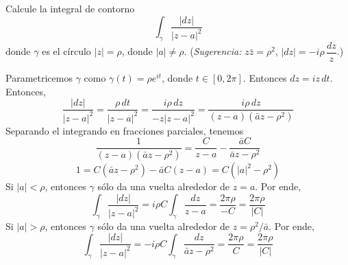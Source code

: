 \begin{exercise}
Calcule la integral de contorno
$$\int_\gamma \frac {|dz|} {|z-a|^2}$$
donde $\gamma$ es el círculo $|z| = \rho$, donde $|a| \ne \rho$. (\textit{Sugerencia:} $z \bar z = \rho^2$, $|dz| = -i\rho \, \dfrac {dz} z$.)
\end{exercise}

\begin{solution}
Parametricemos $\gamma$ como $\gamma(t) = \rho e^{it}$, donde $t \in [0, 2\pi]$. Entonces $dz = iz \, dt$. Entonces,
$$
\frac {|dz|} {|z-a|^2}
    = \frac {\rho \, dt} {|z-a|^2}
    = \frac {i\rho \, dz} {-z |z-a|^2}
    = \frac {i\rho \, dz} {(z - a) (\bar az - \rho^2)}
$$
Separando el integrando en fracciones parciales, tenemos
$$\frac 1 {(z - a) (\bar az - \rho^2)} = \frac C {z - a} - \frac {\bar aC} {\bar az - \rho^2}$$
$$1 = C (\bar az - \rho^2) - \bar aC (z - a) = C (|a|^2 - \rho^2)$$
Si $|a| < \rho$, entonces $\gamma$ sólo da una vuelta alrededor de $z = a$. Por ende,
$$
\int_\gamma \frac {|dz|} {|z-a|^2}
    = i\rho C \int_\gamma \frac {dz} {z-a}
    = \frac {2\pi \rho} {-C}
    = \frac {2\pi \rho} {|C|}
$$
Si $|a| > \rho$, entonces $\gamma$ sólo da una vuelta alrededor de $z = \rho^2 / \bar a$. Por ende,
$$
\int_\gamma \frac {|dz|} {|z-a|^2}
    = -i\rho C \int_\gamma \frac {dz} {\bar az - \rho^2}
    = \frac {2\pi \rho} {C}
    = \frac {2\pi \rho} {|C|}
$$
\end{solution}

